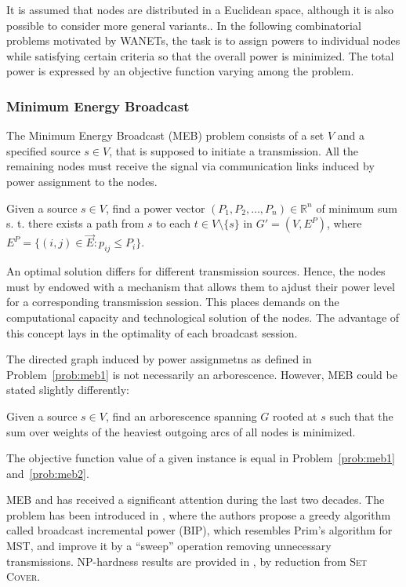 It is assumed that nodes are distributed in a Euclidean space, although it is also possible to consider more general variants..
In the following combinatorial problems motivated by WANETs, the task is to assign powers to individual nodes while satisfying certain criteria so that the overall power is minimized.
The total power is expressed by an objective function varying among the problem.

\subsubsection{Minimum Energy Broadcast}

The Minimum Energy Broadcast (MEB) problem consists of a set $V$ and a specified source $s\in V$, that is supposed to initiate a transmission.
All the remaining nodes must receive the signal via communication links induced by power assignment to the nodes.
\begin{problem}\label{prob:meb1}
Given a source $s\in V$, find a power vector $(P_1,P_2,\dots,P_n)\in\mathbb{R}^n$ of minimum sum s. t. 
there exists a path from $s$ to each $t\in V\setminus\{s\}$ in $G'=(V,E^P)$, where $E^P=\{(i,j)\in \vec{E}: p_{ij}\leq P_i\}$.
\end{problem}
An optimal solution differs for different transmission sources.
Hence, the nodes must by endowed with a mechanism that allows them to ajdust their power level for a corresponding transmission session.
This places demands on the computational capacity and technological solution of the nodes.
The advantage of this concept lays in the optimality of each broadcast session.

The directed graph induced by power assignmetns as defined in Problem~\ref{prob:meb1} is not necessarily an arborescence.
However, MEB could be stated slightly differently:
\begin{problem}\label{prob:meb2}
Given a source $s\in V$, find an arborescence spanning $G$ rooted at $s$ such that 
the sum over weights of the heaviest outgoing arcs of all nodes is minimized.
\end{problem}

\begin{observation}
The objective function value of a given instance is equal in Problem~\ref{prob:meb1} and~\ref{prob:meb2}.
\end{observation}

MEB  and has received a significant attention during the last two decades.
The problem has been introduced in \cite{wieselthier00}, where the authors propose a greedy algorithm called broadcast incremental power (BIP), which resembles Prim's algorithm for MST,
and improve it by a ``sweep'' operation removing unnecessary transmissions.
NP-hardness results are provided in \cite{cagalj02}, by reduction from \textsc{Set Cover}.


